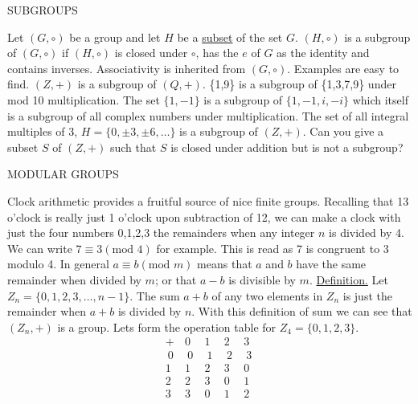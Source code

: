 \documentclass[12pt]{article}
\theoremstyle{definition}
\begin{document}
\centerline{SUBGROUPS}

Let $(G,\circ)$ be a group and let $H$ be a \underline{subset} of the set $G$.  $(H,\circ)$ is a subgroup of $(G,\circ)$ if $(H,\circ)$ is closed under $\circ$, has the $e$ of $G$ as the identity and contains inverses.  Associativity is inherited from $(G,\circ)$.  Examples are easy to find. $(Z,+)$ is a subgroup of $(Q,+)$.  \{1,9\} is a subgroup of \{1,3,7,9\} under mod 10 multiplication.  The set $\{1,-1\}$ is a subgroup of $\{1,-1,i,-i\}$ which itself is a subgroup of all complex numbers under multiplication.  The set of all integral multiples of 3, $H=\{0,\pm3,\pm6,\dots\}$ is a subgroup of $(Z,+)$.  Can you give a subset $S$ of $(Z,+)$ such that $S$ is closed under addition but is not a subgroup?

\centerline{MODULAR GROUPS}

Clock arithmetic provides a fruitful source of nice finite groups.  Recalling that 13 o'clock is really just 1 o'clock upon subtraction of 12, we can make a clock with just the four numbers 0,1,2,3 the remainders when any integer $n$ is divided by 4. We can write $7\equiv3(\text{mod }4)$ for example.  This is read as 7 is congruent to 3 modulo 4.  In general $a\equiv b(\text{mod }m)$ means that $a$ and $b$ have the same remainder when divided by $m$; or that $a-b$ is divisible by $m$.
%
\underline{Definition.}  Let $Z_n=\{0,1,2,3,\dots, n-1\}$.  The sum $a+b$ of any two elements in $Z_n$ is just the remainder when $a+b$ is divided by $n$.  With this definition of sum we can see that $(Z_n,+)$ is a group.  Lets form the operation table for $Z_4=\{0,1,2,3\}$.
$$\begin{array}{c|cccc}
+ & 0 & 1& 2 & 3\\
\hline
~0~ & ~0~ & ~1~ & ~2~ & ~3~\\
1 & 1 & 2 & 3 & 0\\
2 & 2 & 3 & 0 & 1\\
3 & 3 & 0 & 1 & 2
\end{array}$$
\end{document}
